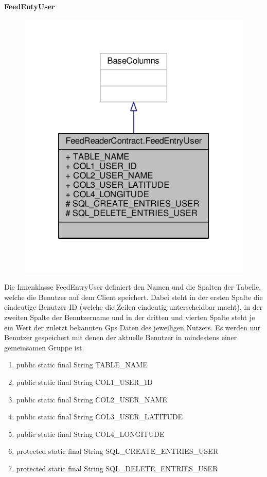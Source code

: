 \textbf{FeedEntyUser}
\begin{figure}[H]
	\includegraphics[scale = 1]{res/umlClasses/feed_reader_contract_user.pdf}
	\centering
\end{figure}
Die Innenklasse FeedEntryUser definiert den Namen und die Spalten der Tabelle, welche die Benutzer auf dem Client speichert. 
Dabei steht in der ersten Spalte die eindeutige Benutzer ID (welche die Zeilen eindeutig unterscheidbar macht), in der zweiten Spalte der Benutzername und in der dritten und vierten Spalte steht je ein Wert der zuletzt bekannten Gps Daten des jeweiligen Nutzers. 
Es werden nur Benutzer gespeichert mit denen der aktuelle Benutzer in mindestens einer gemeinsamen Gruppe ist.
\begin{enumerate}
	\item public static final String TABLE_NAME
	\item public static final String COL1_USER_ID 
	\item public static final String COL2_USER_NAME
	\item public static final String COL3_USER_LATITUDE
	\item public static final String COL4_LONGITUDE
	\item protected static final String SQL_CREATE_ENTRIES_USER
	\item protected static final String SQL_DELETE_ENTRIES_USER
\end{enumerate}


